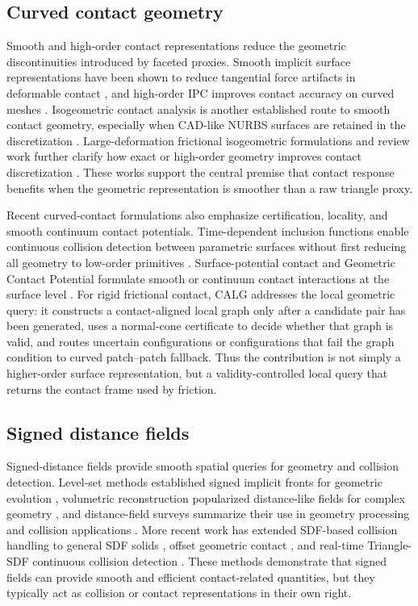\documentclass[preprint,12pt]{elsarticle}
\newcommand{\calg}{\textsc{CALG}}
\begin{document}
\subsection{Curved contact geometry}

Smooth and high-order contact representations reduce the geometric discontinuities introduced by faceted proxies. Smooth implicit surface representations have been shown to reduce tangential force artifacts in deformable contact \cite{du2024smooth}, and high-order IPC improves contact accuracy on curved meshes \cite{ferguson2023highorder}. Isogeometric contact analysis is another established route to smooth contact geometry, especially when CAD-like NURBS surfaces are retained in the discretization \cite{lu2011,temizer2011}. Large-deformation frictional isogeometric formulations and review work further clarify how exact or high-order geometry improves contact discretization \cite{delorenzis2011,delorenzis2014}. These works support the central premise that contact response benefits when the geometric representation is smoother than a raw triangle proxy.

Recent curved-contact formulations also emphasize certification, locality, and smooth continuum contact potentials. Time-dependent inclusion functions enable continuous collision detection between parametric surfaces without first reducing all geometry to low-order primitives \cite{chen2024tdib}. Surface-potential contact and Geometric Contact Potential formulate smooth or continuum contact interactions at the surface level \cite{sauer2012,huang2025gcp}. For rigid frictional contact, \calg{} addresses the local geometric query: it constructs a contact-aligned local graph only after a candidate pair has been generated, uses a normal-cone certificate to decide whether that graph is valid, and routes uncertain configurations or configurations that fail the graph condition to curved patch--patch fallback. Thus the contribution is not simply a higher-order surface representation, but a validity-controlled local query that returns the contact frame used by friction.

\subsection{Signed distance fields}

Signed-distance fields provide smooth spatial queries for geometry and collision detection. Level-set methods established signed implicit fronts for geometric evolution \cite{osher1988}, volumetric reconstruction popularized distance-like fields for complex geometry \cite{curless1996}, and distance-field surveys summarize their use in geometry processing and collision applications \cite{jones2006}. More recent work has extended SDF-based collision handling to general SDF solids \cite{liu2024generalsdf}, offset geometric contact \cite{chen2025ogc}, and real-time Triangle-SDF continuous collision detection \cite{pelletier2025trisdf}. These methods demonstrate that signed fields can provide smooth and efficient contact-related quantities, but they typically act as collision or contact representations in their own right.
\end{document}
